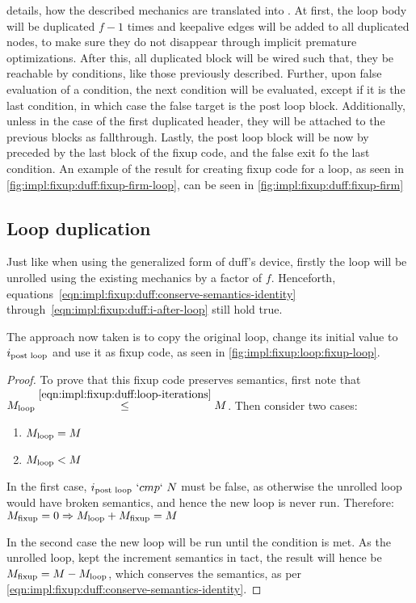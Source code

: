  details, how the described mechanics are translated into \libFIRM.
At first, the loop body will be duplicated $f - 1$ times and keepalive edges will be added to all duplicated nodes, to make sure they do not disappear through implicit premature optimizations.
After this, all duplicated block will be wired such that, they be reachable by conditions, like those previously described.
Further, upon false evaluation of a condition, the next condition will be evaluated, except if it is the last condition, in which case the false target is the post loop block.
Additionally, unless in the case of the first duplicated header, they will be attached to the previous blocks as fallthrough.
Lastly, the post loop block will be now by preceded by the last block of the fixup code, and the false exit fo the last condition.
An example of the result for creating fixup code for a loop, as seen in \cref{fig:impl:fixup:duff:fixup-firm-loop}, can be seen in \cref{fig:impl:fixup:duff:fixup-firm}







\subsection{Loop duplication}\label{sec:impl:fixup:loop}

Just like when using the generalized form of duff's device, firstly the loop will be unrolled using the existing mechanics by a factor of $f$.
Henceforth, equations~\ref{eqn:impl:fixup:duff:conserve-semantics-identity} through~\ref{eqn:impl:fixup:duff:i-after-loop} still hold true.

The approach now taken is to copy the original loop, change its initial value to $i_\text{post loop}$ and use it as fixup code, as seen in \cref{fig:impl:fixup:loop:fixup-loop}.



\begin{proof}
    To prove that this fixup code preserves semantics, first note that $M_{\text{loop}} \overset{\ref{eqn:impl:fixup:duff:loop-iterations}}{\leq} M$.
    Then consider two cases:
    \begin{enumerate}
        \item $M_{\text{loop}} = M$
        \item $M_{\text{loop}} < M$
    \end{enumerate}
    In the first case, $i_\text{post loop}~`cmp`~N$ must be false, as otherwise the unrolled loop would have broken semantics, and hence the new loop is never run.
    Therefore: $M_{\text{fixup}} = 0 \Rightarrow M_{\text{loop}} + M_{\text{fixup}} = M$

    In the second case the new loop will be run until the condition is met.
    As the unrolled loop, kept the increment semantics in tact, the result will hence be $M_{\text{fixup}} = M - M_{\text{loop}}$, which conserves the semantics, as per \cref{eqn:impl:fixup:duff:conserve-semantics-identity}.
\end{proof}

